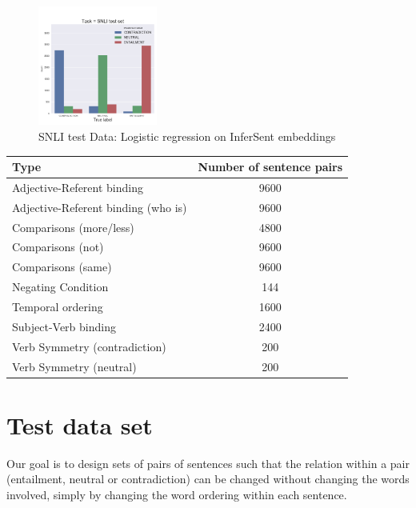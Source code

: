 \documentclass[10pt,letterpaper]{article}
\begin{document}
\begin{figure}[ht!]
\centering
\includegraphics[width=0.35\textwidth]{SNLIInferSentLogRegHistAll.png}
\caption{SNLI test Data: Logistic regression on InferSent embeddings}
\label{fig:SNLIIShist}
\end{figure}

\bgroup
\def\arraystretch{1.5}
\begin{center}
 \begin{tabular}{||p{30mm} c||} 
 \hline
 Type & Number of sentence pairs \\ [0.5ex] 
 \hline\hline
 Adjective-Referent binding & 9600  \\
 \hline
 Adjective-Referent binding (who is) & 9600  \\
 \hline
 Comparisons (more/less)  & 4800 \\
 \hline
 Comparisons (not)  & 9600 \\
 \hline
 Comparisons (same)  & 9600 \\
 \hline
 Negating Condition & 144 \\[1ex] 
 \hline
 Temporal ordering & 1600 \\
 \hline
 Subject-Verb binding & 2400 \\ 
 \hline
 Verb Symmetry (contradiction) & 200 \\ 
 \hline
 Verb Symmetry (neutral) & 200 \\ 
 \hline
 
\end{tabular}
\end{center}


\section{Test data set}
Our goal is to design sets of pairs of sentences such that the relation within a pair (entailment, neutral or contradiction) can be changed without changing the words involved, simply by changing the word ordering within each sentence.
\end{document}
